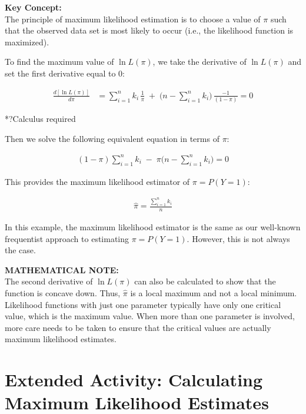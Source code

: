 \documentclass[
]{report}
\begin{document}
\textbf{Key Concept:}\\
The principle of maximum likelihood estimation is to choose a value of \(\pi\) such that the observed data set is most likely to occur (i.e., the likelihood function is maximized).\\
\normalsize

To find the maximum value of \(\ln L(\pi)\), we take the derivative of \(\ln L(\pi)\) and set the first derivative equal to 0:

\begin{align}
\frac{d[\ln L(\pi)]}{d\pi}
&= \sum_{i=1}^n k_i \,\frac{1}{\pi} \;+\;\bigl(n - \sum_{i=1}^n k_i\bigr)\,\frac{-1}{(1 - \pi)} = 0
\tag{7.29}
\end{align}

*?Calculus required

Then we solve the following equivalent equation in terms of \(\pi\):

\begin{align}
(1 - \pi)\sum_{i=1}^n k_i \;-\;\pi\bigl(n - \sum_{i=1}^n k_i\bigr) = 0
\tag{7.30}
\end{align}

This provides the maximum likelihood estimator of \(\pi = P(Y = 1)\):

\begin{align}
\displaystyle \hat{\pi} = \frac{\sum_{i=1}^n k_i}{n}
\tag{7.31}
\end{align}

In this example, the maximum likelihood estimator is the same as our well-known frequentist approach to estimating \(\pi = P(Y = 1)\). However, this is not always the case.

\large

\textbf{MATHEMATICAL NOTE:}\\
The second derivative of \(\ln L(\pi)\) can also be calculated to show that the function is concave down. Thus, \(\hat{\pi}\) is a local maximum and not a local minimum. Likelihood functions with just one parameter typically have only one critical value, which is the maximum value. When more than one parameter is involved, more care needs to be taken to ensure that the critical values are actually maximum likelihood estimates.\\
\normalsize

\hypertarget{extended-activity-calculating-maximum-likelihood-estimates-1}{%
\section*{Extended Activity: Calculating Maximum Likelihood Estimates}\label{extended-activity-calculating-maximum-likelihood-estimates-1}}
\end{document}
